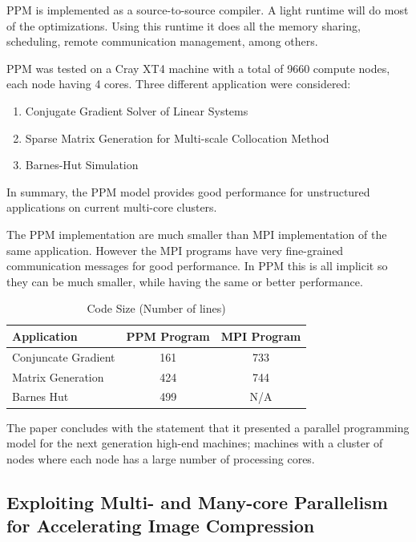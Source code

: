 PPM is implemented as a source-to-source compiler. A light runtime will do most
of the optimizations. Using this runtime it does all the memory sharing,
scheduling, remote communication management, among others.

PPM was tested on a Cray XT4 machine with a total of 9660 compute nodes, each
node having 4 cores. Three different application were considered:

\begin{enumerate}
	\item Conjugate Gradient Solver of Linear Systems
	\item Sparse Matrix Generation for Multi-scale Collocation Method
	\item Barnes-Hut Simulation
\end{enumerate}

In summary, the PPM model provides good performance for unstructured
applications on current multi-core clusters.

The PPM implementation are much smaller than MPI implementation of the same
application. However the MPI programs have very fine-grained communication
messages for good performance. In PPM this is all implicit so they can be
much smaller, while having the same or better performance.

\begin{table}
	\caption{Code Size (Number of lines)}
	\label{tab:code-size}
	\centering
	\begin{tabular}[!h]{|l|c|c|}
		\hline
		Application				& PPM Program	& MPI Program 	\\ \hline
		Conjuncate Gradient		& 161			& 733			\\ \hline
		Matrix Generation		& 424			& 744			\\ \hline
		Barnes Hut				& 499			& N/A			\\ \hline
	\end{tabular}
\end{table}

The paper concludes with the statement that it presented a parallel programming
model for the next generation high-end machines; machines with a cluster of
nodes where each node has a large number of processing cores.

\subsection{Exploiting Multi- and Many-core Parallelism for Accelerating Image Compression}

